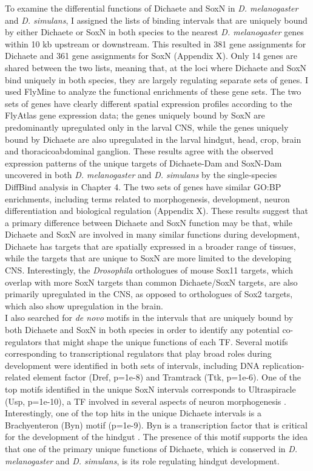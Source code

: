 To examine the differential functions of Dichaete and SoxN in \emph{D. melanogaster} and \emph{D. simulans}, I assigned the lists of binding intervals that are uniquely bound by either Dichaete or SoxN in both species to the nearest \emph{D. melanogaster} genes within 10 kb upstream or downstream. This resulted in 381 gene assignments for Dichaete and 361 gene assignments for SoxN (Appendix X). Only 14 genes are shared between the two lists, meaning that, at the loci where Dichaete and SoxN bind uniquely in both species, they are largely regulating separate sets of genes. I used FlyMine to analyze the functional enrichments of these gene sets. The two sets of genes have clearly different spatial expression profiles according to the FlyAtlas gene expression data; the genes uniquely bound by SoxN are predominantly upregulated only in the larval CNS, while the genes uniquely bound by Dichaete are also upregulated in the larval hindgut, head, crop, brain and thoracicoabdominal ganglion. These results agree with the observed expression patterns of the unique targets of Dichaete-Dam and SoxN-Dam uncovered in both \emph{D. melanogaster} and \emph{D. simulans} by the single-species DiffBind analysis in Chapter 4. The two sets of genes have similar GO:BP enrichments, including terms related to morphogenesis, development, neuron differentiation and biological regulation (Appendix X). These results suggest that a primary difference between Dichaete and SoxN function may be that, while Dichaete and SoxN are involved in many similar functions during development, Dichaete has targets that are spatially expressed in a broader range of tissues, while the targets that are unique to SoxN are more limited to the developing CNS. Interestingly, the \emph{Drosophila} orthologues of mouse Sox11 targets, which overlap with more SoxN targets than common Dichaete/SoxN targets, are also primarily upregulated in the CNS, as opposed to orthologues of Sox2 targets, which also show upregulation in the brain.\\

I also searched for \emph{de novo} motifs in the intervals that are uniquely bound by both Dichaete and SoxN in both species in order to identify any potential co-regulators that might shape the unique functions of each TF. Several motifs corresponding to transcriptional regulators that play broad roles during development were identified in both sets of intervals, including DNA replication-related element factor (Dref, p=1e-8) and Tramtrack (Ttk, p=1e-6). One of the top motifs identified in the unique SoxN intervals corresponds to Ultraspiracle (Usp, p=1e-10), a TF involved in several aspects of neuron morphogenesis \citep{lee_cell-autonomous_????,parrish_genome-wide_2006}. Interestingly, one of the top hits in the unique Dichaete intervals is a Brachyenteron (Byn) motif (p=1e-9). Byn is a transcription factor that is critical for the development of the hindgut \citep{kispert_homologs_1994,murakami_developmental_1999}. The presence of this motif supports the idea that one of the primary unique functions of Dichaete, which is conserved in \emph{D. melanogaster} and \emph{D. simulans}, is its role regulating hindgut development.\\

